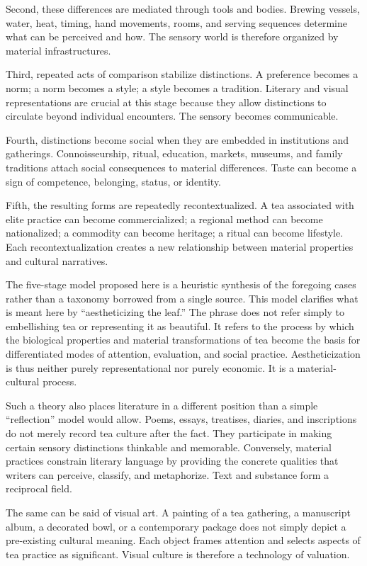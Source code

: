 \documentclass[11pt,a4paper]{article}
\begin{document}
Second, these differences are mediated through tools and bodies. Brewing vessels, water, heat, timing, hand movements, rooms, and serving sequences determine what can be perceived and how. The sensory world is therefore organized by material infrastructures.

Third, repeated acts of comparison stabilize distinctions. A preference becomes a norm; a norm becomes a style; a style becomes a tradition. Literary and visual representations are crucial at this stage because they allow distinctions to circulate beyond individual encounters. The sensory becomes communicable.

Fourth, distinctions become social when they are embedded in institutions and gatherings. Connoisseurship, ritual, education, markets, museums, and family traditions attach social consequences to material differences. Taste can become a sign of competence, belonging, status, or identity.

Fifth, the resulting forms are repeatedly recontextualized. A tea associated with elite practice can become commercialized; a regional method can become nationalized; a commodity can become heritage; a ritual can become lifestyle. Each recontextualization creates a new relationship between material properties and cultural narratives.

The five-stage model proposed here is a heuristic synthesis of the foregoing cases rather than a taxonomy borrowed from a single source. This model clarifies what is meant here by ``aestheticizing the leaf.'' The phrase does not refer simply to embellishing tea or representing it as beautiful. It refers to the process by which the biological properties and material transformations of tea become the basis for differentiated modes of attention, evaluation, and social practice. Aestheticization is thus neither purely representational nor purely economic. It is a material-cultural process.

Such a theory also places literature in a different position than a simple ``reflection'' model would allow. Poems, essays, treatises, diaries, and inscriptions do not merely record tea culture after the fact. They participate in making certain sensory distinctions thinkable and memorable. Conversely, material practices constrain literary language by providing the concrete qualities that writers can perceive, classify, and metaphorize. Text and substance form a reciprocal field.

The same can be said of visual art. A painting of a tea gathering, a manuscript album, a decorated bowl, or a contemporary package does not simply depict a pre-existing cultural meaning. Each object frames attention and selects aspects of tea practice as significant. Visual culture is therefore a technology of valuation.
\end{document}
